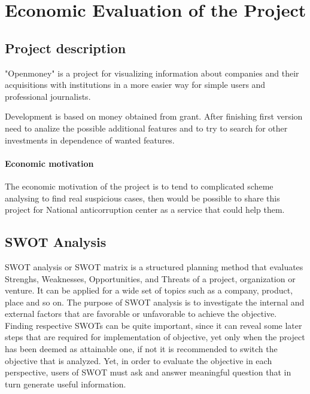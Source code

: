 \documentclass[12pt,a4paper,titlepage]{article}
\begin{document}
	



\newpage
\section{Economic Evaluation of the Project}



\subsection{Project description}

\label{section:4.project-description}

"Openmoney" is a project for visualizing information about companies and their acquisitions with institutions in a more easier way for simple users and professional journalists.

Development is based on money obtained from grant. After finishing first version need to analize the possible additional features and to try to search for other investments in dependence of wanted features.


\paragraph{Economic motivation}

The economic motivation of the project is to tend to complicated scheme analysing to find real suspicious cases, then would be possible to share this project for National anticorruption center as a service that could help them.

\subsection{SWOT Analysis}
\label{section:4.swot-analysis}
SWOT analysis or SWOT matrix is a structured planning method that evaluates Strenghs, Weaknesses, Opportunities, and Threats of a project, organization or venture. It can be applied for a wide set of topics such as a company, product, place and so on. The purpose of SWOT analysis is to investigate the internal and external factors that are favorable or unfavorable to achieve the objective. Finding respective SWOTs can be quite important, since it can reveal some later steps that are required for implementation of objective, yet only when the project has been deemed as attainable one, if not it is recommended to switch the objective that is analyzed. Yet, in order to evaluate the objective in each perspective, users of SWOT must ask and answer meaningful question that in turn generate useful information. 
\end{document}

